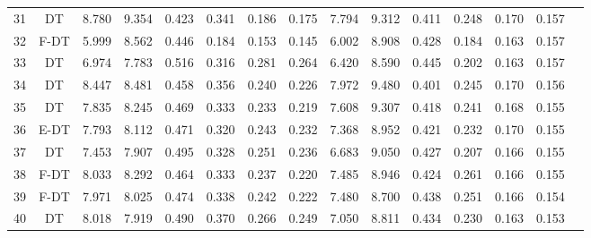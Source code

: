 \begin{longtable}{@{\hskip3pt}c@{\hskip3pt}c@{\hskip3pt}c@{\hskip3pt}c@{\hskip3pt}c@{\hskip3pt}c@{\hskip3pt}c@{\hskip3pt}c@{\hskip3pt}c@{\hskip3pt}c@{\hskip3pt}c@{\hskip3pt}c@{\hskip3pt}c@{\hskip3pt}c@{\hskip3pt}c}
         31 &             DT &             8.780 &       9.354 &         0.423 &       0.341 &       0.186 &        0.175 &               7.794 &       9.312 &         0.411 &       0.248 &       0.170 &        0.157 \\
         32 &           F-DT &             5.999 &       8.562 &         0.446 &       0.184 &       0.153 &        0.145 &               6.002 &       8.908 &         0.428 &       0.184 &       0.163 &        0.157 \\
         33 &             DT &             6.974 &       7.783 &         0.516 &       0.316 &       0.281 &        0.264 &               6.420 &       8.590 &         0.445 &       0.202 &       0.163 &        0.157 \\
         34 &             DT &             8.447 &       8.481 &         0.458 &       0.356 &       0.240 &        0.226 &               7.972 &       9.480 &         0.401 &       0.245 &       0.170 &        0.156 \\
         35 &             DT &             7.835 &       8.245 &         0.469 &       0.333 &       0.233 &        0.219 &               7.608 &       9.307 &         0.418 &       0.241 &       0.168 &        0.155 \\
         36 &           E-DT &             7.793 &       8.112 &         0.471 &       0.320 &       0.243 &        0.232 &               7.368 &       8.952 &         0.421 &       0.232 &       0.170 &        0.155 \\
         37 &             DT &             7.453 &       7.907 &         0.495 &       0.328 &       0.251 &        0.236 &               6.683 &       9.050 &         0.427 &       0.207 &       0.166 &        0.155 \\
         38 &           F-DT &             8.033 &       8.292 &         0.464 &       0.333 &       0.237 &        0.220 &               7.485 &       8.946 &         0.424 &       0.261 &       0.166 &        0.155 \\
         39 &           F-DT &             7.971 &       8.025 &         0.474 &       0.338 &       0.242 &        0.222 &               7.480 &       8.700 &         0.438 &       0.251 &       0.166 &        0.154 \\
         40 &             DT &             8.018 &       7.919 &         0.490 &       0.370 &       0.266 &        0.249 &               7.050 &       8.811 &         0.434 &       0.230 &       0.163 &        0.153 \\

\end{longtable}
